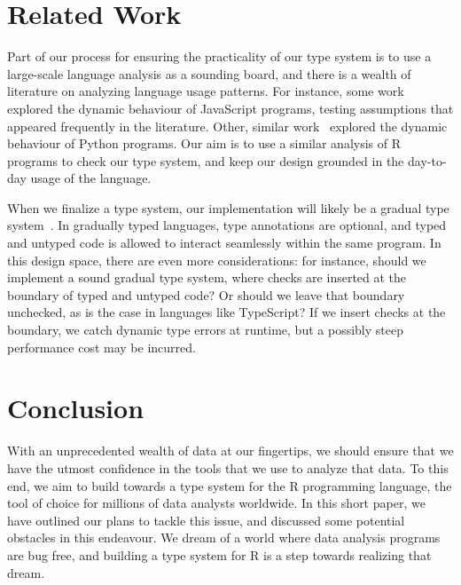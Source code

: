 \documentclass[sigplan,10pt,review]{acmart}\settopmatter{printfolios=true,printccs=false,printacmref=false}
\begin{document}
%
%
%
%
\section{Related Work}

Part of our process for ensuring the practicality of our type system is to use a large-scale language analysis as a sounding board, and there is a wealth of literature on analyzing language usage patterns.
For instance, some work~\cite{pldi10a} explored the dynamic behaviour of JavaScript programs, testing assumptions that appeared frequently in the literature.
Other, similar work~\cite{PythonAintDynamic} explored the dynamic behaviour of Python programs.
Our aim is to use a similar analysis of R programs to check our type system, and keep our design grounded in the day-to-day usage of the language.

When we finalize a type system, our implementation will likely be a gradual type system~\cite{tf-dls06}.
In gradually typed languages, type annotations are optional, and typed and untyped code is allowed to interact seamlessly within the same program.
In this design space, there are even more considerations: for instance, should we implement a sound gradual type system, where checks are inserted at the boundary of typed and untyped code?
Or should we leave that boundary unchecked, as is the case in languages like TypeScript?
If we insert checks at the boundary, we catch dynamic type errors at runtime, but a possibly steep~\cite{popl16} performance cost may be incurred.

%
%
%
%
\section{Conclusion}

With an unprecedented wealth of data at our fingertips, we should ensure that we have the utmost confidence in the tools that we use to analyze that data.
To this end, we aim to build towards a type system for the R programming language, the tool of choice for millions of data analysts worldwide. 
In this short paper, we have outlined our plans to tackle this issue, and discussed some potential obstacles in this endeavour.
We dream of a world where data analysis programs are bug free, and building a type system for R is a step towards realizing that dream.

%
%
%


\end{document}
